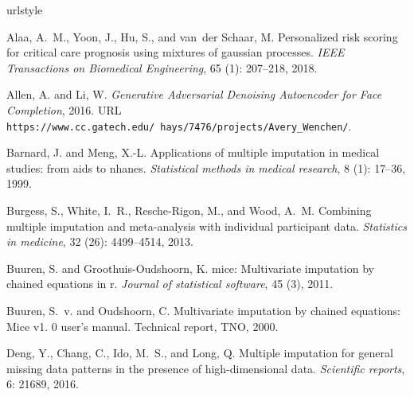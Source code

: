 \documentclass{article}
\begin{document}
\begin{thebibliography}{29}
	\providecommand{\natexlab}[1]{#1}
	\providecommand{\url}[1]{\texttt{#1}}
	\expandafter\ifx\csname urlstyle\endcsname\relax
	\providecommand{\doi}[1]{doi: #1}\else
	\providecommand{\doi}{doi: \begingroup \urlstyle{rm}\Url}\fi
	
	Alaa, A.~M., Yoon, J., Hu, S., and van~der Schaar, M.
	\newblock Personalized risk scoring for critical care prognosis using mixtures
	of gaussian processes.
	\newblock \emph{IEEE Transactions on Biomedical Engineering}, 65
	(1): 207--218, 2018.
	
	Allen, A. and Li, W.
	\newblock \emph{Generative Adversarial Denoising Autoencoder for Face
		Completion}, 2016.
	\newblock URL
	\url{https://www.cc.gatech.edu/~hays/7476/projects/Avery_Wenchen/}.
	
	Barnard, J. and Meng, X.-L.
	\newblock Applications of multiple imputation in medical studies: from aids to
	nhanes.
	\newblock \emph{Statistical methods in medical research}, 8
	(1): 17--36, 1999.
	
	Burgess, S., White, I.~R., Resche-Rigon, M., and Wood, A.~M.
	\newblock Combining multiple imputation and meta-analysis with individual
	participant data.
	\newblock \emph{Statistics in medicine}, 32 (26): 4499--4514,
	2013.
	
	Buuren, S. and Groothuis-Oudshoorn, K.
	\newblock mice: Multivariate imputation by chained equations in r.
	\newblock \emph{Journal of statistical software}, 45 (3), 2011.
	
	Buuren, S.~v. and Oudshoorn, C.
	\newblock Multivariate imputation by chained equations: Mice v1. 0 user's
	manual.
	\newblock Technical report, TNO, 2000.
	
	Deng, Y., Chang, C., Ido, M.~S., and Long, Q.
	\newblock Multiple imputation for general missing data patterns in the presence
	of high-dimensional data.
	\newblock \emph{Scientific reports}, 6: 21689, 2016.
	

\end{thebibliography}
\end{document}
